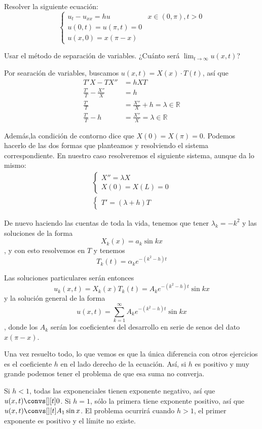 \begin{problem}[6] Resolver la siguiente ecuación: \[
\begin{cases}
u_t - u_{xx} = hu & x ∈ (0,π), t > 0 \\
u(0,t) = u(π,t) = 0 \\
u(x,0) = x(π-x)
\end{cases}\]

Usar el método de separación de variables. ¿Cuánto será $\lim_{t \to ∞} u(x,t)$?

\solution

Por searación de variables, buscamos $u(x,t) = X(x)·T(t)$, así que \begin{align*}
T'X-TX'' &= hXT \\
\frac{T'}{T} - \frac{X''}{X} &= h \\
\frac{T'}{T} &= \frac{X''}{X} + h = λ ∈ ℝ \\
\frac{T'}{T} - h &= \frac{X''}{X} = λ ∈ ℝ
\end{align*}

Además,la condición de contorno dice que $X(0) = X(π) = 0$. Podemos hacerlo de las dos formas que planteamos y resolviendo el sistema correspondiente. En nuestro caso resolveremos el siguiente sistema, aunque da lo mismo:
\begin{gather*}
\begin{cases}
X'' = λX \\
X(0) = X(L) = 0
\end{cases}
\\
\begin{cases} T' = (λ+h)T \end{cases} \end{gather*}

De nuevo haciendo las cuentas de toda la vida, tenemos que tener $λ_k = - k^2$ y las soluciones de la forma \[ X_k(x) = a_k \sin kx \], y con esto resolvemos en $T$ y tenemos \[ T_k(t) = α_k e^{-(k^2-h)t} \]

Las soluciones particulares serán entonces \[ u_k(x,t) = X_k(x) T_k(t) = A_k e^{-(k^2-h)t} \sin kx \] y la solución general de la forma \[ u(x,t) = \sum_{k=1}^{∞} A_k e^{-(k^2-h)t} \sin kx \], donde los $A_k$ serán los coeficientes del desarrollo en serie de senos del dato $x(π-x)$.

Una vez resuelto todo, lo que vemos es que la única diferencia con otros ejercicios es el coeficiente $h$ en el lado derecho de la ecuación. Así, si $h$ es positivo y muy grande podemos tener el problema de que esa suma no converja.

Si $h < 1$, todas las exponenciales tienen exponente negativo, así que $u(x,t) \convs[][t] 0$. Si $h = 1$, sólo la primera tiene exponente positivo, así que $u(x,t) \convs[][t] A_1 \sin x$. El problema ocurrirá cuando $h > 1$, el primer exponente es positivo y el límite no existe.

\end{problem}

